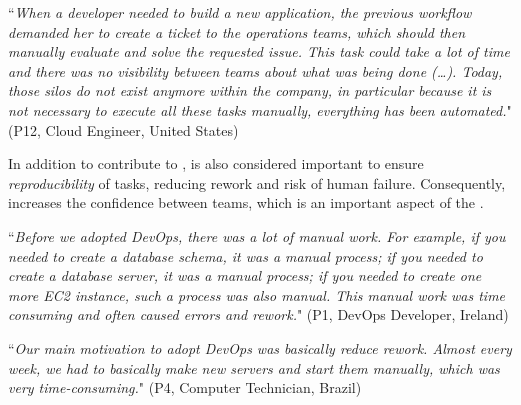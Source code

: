 \begin{mq}
``\emph{When a developer needed to build a new application, the previous workflow demanded her
to create a ticket to the operations teams, which should then manually evaluate and solve
the requested issue. This task could take a lot of time and there was no
visibility between teams about what was being done (\ldots). Today, those silos do not exist
anymore within the company, in particular because it is not necessary to execute all these tasks manually,
everything has been automated.}" (P12, Cloud Engineer, United States)
\end{mq}

In addition to contribute to ,  is also considered
important to ensure \emph{reproducibility} of tasks, reducing rework and risk of
human failure. Consequently,  increases the confidence
between teams, which is an important aspect of the .

\begin{mq}
``\emph{Before we adopted DevOps, there was a lot of manual work. For example, if you
needed to create a database schema, it was a manual process; if you needed to create a
database server, it was a manual process; if you needed to create one more EC2 instance,
such a process was also manual. This manual work was time consuming and often caused errors and
rework.}" (P1, DevOps Developer, Ireland)
\end{mq}

\begin{mq}
``\emph{Our main motivation to adopt DevOps was basically reduce rework. Almost every
week, we had to basically make new servers and start them manually, which was
very time-consuming.}" (P4, Computer Technician, Brazil)
\end{mq}

